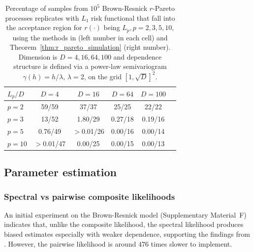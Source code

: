 \documentclass[12pt]{article}
\begin{document}
\begin{table}[]
    \centering
    \caption{\small Percentage of samples from $10^5$ Brown-Resnick $r$-Pareto processes replicates with $L_1$ risk functional that fall into the acceptance region for $r(\cdot)$ being $L_p,p=2,3,5,10$, using the methods in \citet{Dombry.etal:2024} (left number in each cell) and Theorem~\ref{thm:r_pareto_simulation} (right number). Dimension is $D=4,16,64,100$ and dependence structure is defined via a power-law semivariogram $\gamma(h)=h/\lambda$, $\lambda=2$, on the grid $[1,\sqrt{D}]^2$.}
    \begin{tabular}{lccccc}
    $L_p/D$ & \phantom{$>$}$D=4$ & \phantom{$>$}$D=16$ & $D=64$ & $D=100$ \\
    \hline
    $p=2$ & \phantom{$>$0.}59/59 & \phantom{$>$0.}37/37 & \phantom{0.}25/25 & \phantom{0.}22/22\\
    $p=3$ & \phantom{$>$0.}13/52 & \phantom{$>$}1.80/29 & 0.27/18 & 0.19/16\\
     $p=5$ & \phantom{$>$}0.76/49 & $>$0.01/26 & 0.00/16 & 0.00/14\\
    $p=10$ & $>$0.01/47 & \phantom{$>$}0.00/25 & 0.00/15 & 0.00/13\\
    \hline
\end{tabular}
    \label{tab:simu_exceedances_p_d}
\end{table}

\subsection{Parameter estimation}
\label{ssec:par_est}

\subsubsection{Spectral vs pairwise composite likelihoods}

An initial experiment on the Brown-Resnick model (Supplementary Material~F) 
indicates that, unlike the composite likelihood, the spectral likelihood produces biased estimates especially with weaker dependence, supporting the findings from \citet{Engelke.etal:2015, Huser.etal:2016}. 
However, the pairwise likelihood 
is around $476$ times slower to implement.
%
\end{document}
